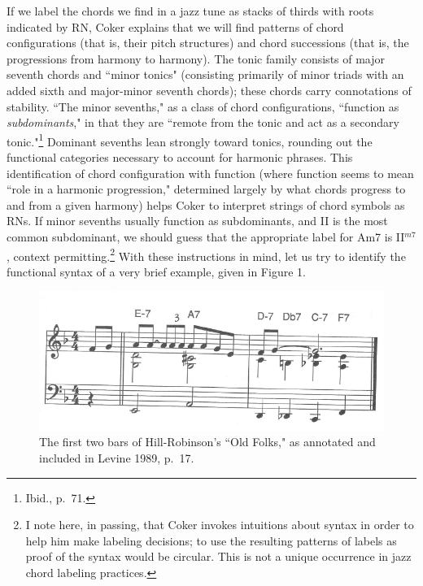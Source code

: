 If we label the chords we find in a jazz tune as stacks of thirds with roots indicated by RN, Coker explains that we will find patterns of chord configurations (that is, their pitch structures) and chord successions (that is, the progressions from harmony to harmony).  The tonic family consists of major seventh chords and ``minor tonics" (consisting primarily of minor triads with an added sixth and major-minor seventh chords); these chords carry connotations of stability.  ``The minor sevenths," as a class of chord configurations, ``function as \emph{subdominants}," in that they are ``remote from the tonic and act as a secondary tonic."\footnote{Ibid., p.\ 71.}  Dominant sevenths lean strongly toward tonics, rounding out the functional categories necessary to account for harmonic phrases.  This identification of chord configuration with function (where function seems to mean ``role in a harmonic progression," determined largely by what chords progress to and from a given harmony) helps Coker to interpret strings of chord symbols as RNs.  If minor sevenths usually function as subdominants, and II is the most common subdominant, we should guess that the appropriate label for Am7 is II$^{m7}$, context permitting.\footnote{I note here, in passing, that Coker invokes intuitions about syntax in order to help him make labeling decisions; to use the resulting patterns of labels as proof of the syntax would be circular.  This is not a unique occurrence in jazz chord labeling practices.}  With these instructions in mind, let us try to identify the functional syntax of a very brief example, given in Figure 1.
\begin{figure}
	\centering
	\caption{The first two bars of Hill-Robinson's ``Old Folks," as annotated and included in Levine 1989, p.\ 17.}
	\includegraphics[width=5in]{levine_31.png}
\end{figure}


